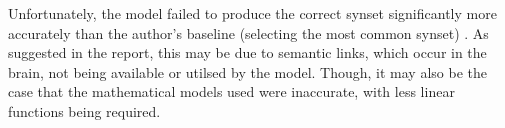 \documentclass[]{article}
\begin{document}
Unfortunately, the model failed to produce the correct synset significantly more accurately than the author's baseline (selecting the most common synset) \cite{MattBurkePrevious}. As suggested in the report, this may be due to semantic links, which occur in the brain, not being available or utilsed by the model. Though, it may also be the case that the mathematical models used were inaccurate, with less linear functions being required.

\newpage


\end{document}
